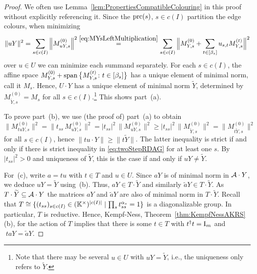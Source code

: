 \begin{proof}
	We often use Lemma~\ref{lem:PropertiesCompatibleColouring} in this proof without explicitly referencing it.
	Since the $\operatorname{prc}(s)$, $s \in c(I)$ partition the edge colours, when minimizing
		\[ \|uY\|^2 = \sum_{s \in c(I)} \Big\| M_{uY,s}^{(0)} \Big\|^2 \overset{\eqref{eq:MYsLeftMultiplication}}{=}
		\sum_{s \in c(I)} \Big\| M_{Y,s}^{(0)} + \sum_{t \in [\beta_s]} u_{s,t} M_{Y,s}^{(t)} \Big\|^2 \]
	over $u \in U$ we can minimize each summand separately. For each $s \in c(I)$, the affine space $M_{Y,s}^{(0)} + \operatorname{span} \big\lbrace M_{Y,s}^{(t)} \colon t \in [\beta_s] \big\rbrace$ has a unique element of minimal norm, call it $M_s$. Hence, $U \cdot Y$ has a unique element of minimal norm $\widetilde{Y}$, determined by $M_{\widetilde{Y},s}^{(0)} = M_s$ for all $s \in c(I)$.\footnote{Note that there may be several $u \in U$ with $uY = \widetilde{Y}$, i.e., the uniqueness only refers to $\widetilde{Y}$.}
	This shows part~(a).
	
	To prove part~(b), we use (the proof of) part~(a) to obtain
	\begin{equation}\label{eq:twoStepRDAG}
		\big\| M_{tuY,s}^{(0)} \big\|^2 = \big\| t_{ss} \, M_{uY,s}^{(0)} \big\|^2
		= |t_{ss}|^2 \, \big\| M_{uY,s}^{(0)} \big\|^2 \geq |t_{ss}|^2 \, \big\| M_{\widetilde{Y},s}^{(0)} \big\|^2 = \big\| M_{t \widetilde{Y},s}^{(0)} \big\|^2
	\end{equation}
	for all $s \in c(I)$, hence $\|tu \cdot Y \| \geq \| t\widetilde{Y} \|$. The latter inequality is strict if and only if there is strict inequality in \eqref{eq:twoStepRDAG} for at least one $s$. By $ |t_{ss}|^2 > 0$ and uniqueness of $\widetilde{Y}$, this is the case if and only if $uY \neq \widetilde{Y}$.
	
	For~(c), write $a = tu$ with $t \in T$ and $u \in U$. Since $aY$ is of minimal norm in $\mathcal{A} \cdot Y$, we deduce $uY = \widetilde{Y}$ using~(b). Thus, $aY \in T \cdot \widetilde{Y}$ and similarly $\widetilde{a}Y \in T \cdot \widetilde{Y}$. As $T \cdot \widetilde{Y} \subseteq \mathcal{A} \cdot Y$ the matrices $aY$ and $\widetilde{a}Y$ are also of minimal norm in $T \cdot \widetilde{Y}$. Recall that $T \cong \{ (t_{ss})_{s \in c(I)} \in (\mathbb K^{\times})^{|c(I)|} \mid \prod_s t_{ss}^{\alpha_s} = 1\}$ is a diagonalizable group. In particular, $T$ is reductive. Hence, Kempf-Ness, Theorem~\ref{thm:KempfNessAKRS}(b), for the action of $T$ implies that there is some $t \in T$ with $t^{\dagger} t = \operatorname{I}_m$ and $\; taY = \widetilde{a}Y$.
\end{proof}

